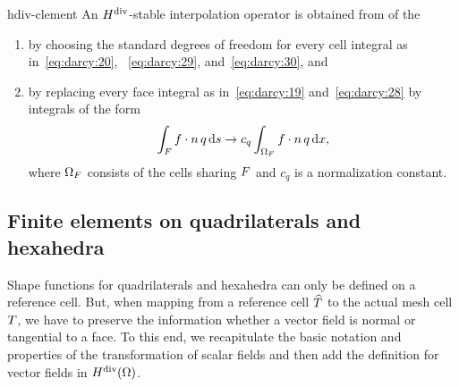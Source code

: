 \begin{Definition}{hdiv-clement}
  An $H^{\text{div}}$-stable interpolation operator is obtained from
   of the
  \begin{enumerate}
  \item by choosing the standard degrees of freedom for every cell
    integral as in~\eqref{eq:darcy:20}, ~\eqref{eq:darcy:29},
    and~\eqref{eq:darcy:30}, and
  \item by replacing every face integral as in~\eqref{eq:darcy:19}
    and~\eqref{eq:darcy:28} by integrals of the form
    \begin{gather}
      \int_{F} f\cdot n \,q \,\mathrm{d} s
      \to
      c_q \int_{\Omega_F} f\cdot n \,q \,\mathrm{d} x,
    \end{gather}
    where $\Omega_F$ consists of the cells sharing $F$ and
    $c_q$ is a normalization constant.
  \end{enumerate}
\end{Definition}

\subsection{Finite elements on quadrilaterals and hexahedra}

\begin{intro}
  Shape functions for quadrilaterals and hexahedra can only be defined
  on a reference cell. But, when mapping from a reference cell
  $\widehat {T}$ to the actual mesh cell $T$, we have to preserve the
  information whether a vector field is normal or tangential to a
  face. To this end, we recapitulate the basic notation and properties
  of the transformation of scalar fields and then add the definition
  for vector fields in $H^{\text{div}}(\Omega)$.
\end{intro}

